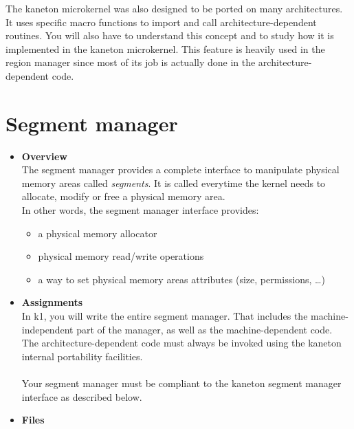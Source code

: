 The kaneton microkernel was also designed to be ported on many
architectures. It uses specific macro functions to import and call
architecture-dependent routines. You will also have
to understand this concept and to study how it is implemented in the
kaneton microkernel. This feature is heavily used in the region manager since
most of its job is actually done in the architecture-dependent code.

%
%

\newpage

\section{Segment manager}

\begin{itemize}
  \item {\bf Overview}\\
    The segment manager provides a complete interface to manipulate physical
    memory areas called {\em segments}. It is called everytime the kernel
    needs to allocate, modify or free a physical memory area.\\

    In other words, the segment manager interface provides:
    \begin{itemize}
    \item a physical memory allocator
    \item physical memory read/write operations
    \item a way to set physical memory areas attributes (size, permissions, \ldots)\\
      \end{itemize}

  \item {\bf Assignments}\\
    In k1, you will write the entire segment manager. That includes the
    machine-independent part of the manager, as well as the machine-dependent
    code.\\

    The architecture-dependent code must always be invoked using the kaneton
    internal portability facilities.\\
    \\
    Your segment manager must be compliant to the kaneton segment manager
    interface as described below.\\

  \item {\bf {Files}}\\


\end{itemize}
